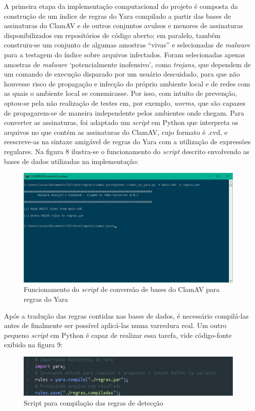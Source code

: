 A primeira etapa da implementação computacional do projeto é composta da
construção de um índice de regras do Yara compilado a partir das bases de
assinaturas do ClamAV e de outros conjuntos avulsos e menores de assinaturas
disponibilizados em repositórios de código aberto; em paralelo, também
construiu-se um conjunto de algumas amostras ``vivas'' e selecionadas de
\textit{malware} para a testagem do índice sobre arquivos infectados. Foram
selecionadas apenas amostras de \textit{malware} `potencialmente inofensivo',
como \textit{trojans}, que dependem de um comando de execução disparado por um
usuário descuidado, para que não houvesse risco de propagação e infecção do
próprio ambiente local e de redes com as quais o ambiente local se comunicasse.
Por isso, com intuito de prevenção, optou-se pela não realização de testes em,
por exemplo, \textit{worms}, que são capazes de propagarem-se de maneira
independente pelos ambientes onde chegam. Para converter as assinaturas, foi
adaptado um \textit{script} em Python que interpreta os arquivos no que contém
as assinaturas do ClamAV, cujo formato é .cvd, e reescreve-as na sintaxe
amigável de regras do Yara com a utilização de expressões regulares. Na figura
8 ilustra-se o funcionamento do \textit{script} descrito envolvendo as
bases de dados utilizadas na implementação:
\begin{figure}[H]
  \includegraphics[scale=0.6]{figs/regras_convertidas}
  \centering
  \caption{Funcionamento do \textit{script} de conversão de bases do ClamAV para regras do Yara}
  \label{f.regras_convertidas}
\end{figure}

Após a tradução das regras contidas nas bases de dados, é necessário compilá-las
antes de finalmente ser possível aplicá-las numa varredura real. Um outro
pequeno \textit{script} em Python é capaz de realizar essa tarefa, vide
código-fonte exibido na figura 9:
\begin{figure}[H]
  \includegraphics[scale=0.6]{figs/script_conversao}
  \centering
  \caption{Script para compilação das regras de detecção}
  \label{f.script_comp}
\end{figure}

